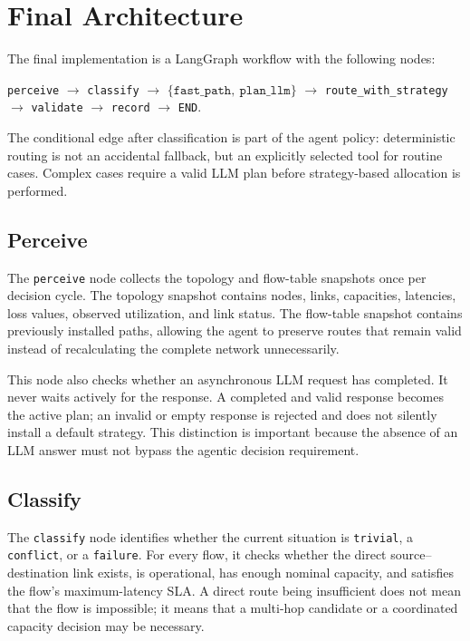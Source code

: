 \section{Final Architecture}

The final implementation is a LangGraph workflow with the following nodes:

\begin{center}
\texttt{perceive} $\rightarrow$ \texttt{classify} $\rightarrow$
$\{\texttt{fast\_path},\ \texttt{plan\_llm}\}$ $\rightarrow$
\texttt{route\_with\_strategy} $\rightarrow$ \texttt{validate}
$\rightarrow$ \texttt{record} $\rightarrow$ \texttt{END}.
\end{center}

The conditional edge after classification is part of the agent policy: deterministic
routing is not an accidental fallback, but an explicitly selected tool for routine
cases. Complex cases require a valid LLM plan before strategy-based allocation is
performed.

\subsection{Perceive}

The \texttt{perceive} node collects the topology and flow-table snapshots once per
decision cycle. The topology snapshot contains nodes, links, capacities, latencies,
loss values, observed utilization, and link status. The flow-table snapshot contains
previously installed paths, allowing the agent to preserve routes that remain valid
instead of recalculating the complete network unnecessarily.

This node also checks whether an asynchronous LLM request has completed. It never waits
actively for the response. A completed and valid response becomes the active plan; an
invalid or empty response is rejected and does not silently install a default strategy.
This distinction is important because the absence of an LLM answer must not bypass the
agentic decision requirement.

\subsection{Classify}

The \texttt{classify} node identifies whether the current situation is
\texttt{trivial}, a \texttt{conflict}, or a \texttt{failure}. For every flow, it
checks whether the direct source--destination link exists, is operational, has enough
nominal capacity, and satisfies the flow's maximum-latency SLA. A direct route being
insufficient does not mean that the flow is impossible; it means that a multi-hop
candidate or a coordinated capacity decision may be necessary.

